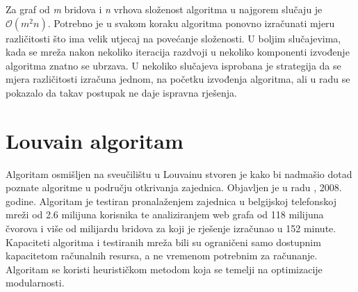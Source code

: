 Za graf od \textit{m} bridova i \textit{n} vrhova složenost algoritma u najgorem slučaju je $\mathcal{O}(m^{2}n)$. Potrebno je u svakom koraku algoritma ponovno izračunati mjeru različitosti što ima velik utjecaj na povećanje složenosti. U boljim slučajevima, kada se mreža nakon nekoliko iteracija razdvoji u nekoliko komponenti izvođenje algoritma znatno se ubrzava. U nekoliko slučajeva isprobana je strategija da se mjera različitosti izračuna jednom, na početku izvođenja algoritma, ali u radu \cite{girvan2002community} se pokazalo da takav postupak ne daje ispravna rješenja.

\pagebreak

\section{Louvain algoritam}

Algoritam osmišljen na sveučilištu u Louvainu stvoren je kako bi nadmašio dotad poznate algoritme u području otkrivanja zajednica. Objavljen je u radu \cite{blondel2008fast}, 2008. godine. Algoritam je testiran pronalaženjem zajednica u belgijskoj telefonskoj mreži od 2.6 milijuna korisnika te analiziranjem web grafa od 118 milijuna čvorova i više od milijardu bridova za koji je rješenje izračunao u 152 minute. Kapaciteti algoritma i testiranih mreža bili su ograničeni samo dostupnim kapacitetom računalnih resursa, a ne vremenom potrebnim za računanje. Algoritam se koristi heurističkom metodom koja se temelji na optimizacije modularnosti. 

